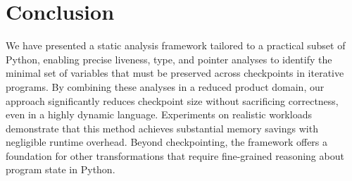\section{Conclusion}
We have presented a static analysis framework tailored to a practical subset of Python, enabling precise liveness, type, and pointer analyses to identify the minimal set of variables that must be preserved across checkpoints in iterative programs. By combining these analyses in a reduced product domain, our approach significantly reduces checkpoint size without sacrificing correctness, even in a highly dynamic language. Experiments on realistic workloads demonstrate that this method achieves substantial memory savings with negligible runtime overhead. Beyond checkpointing, the framework offers a foundation for other transformations that require fine-grained reasoning about program state in Python.
